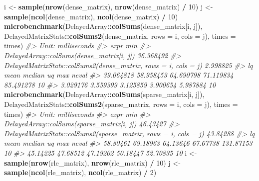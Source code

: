 \documentclass[]{book}
\newenvironment{Shaded}{\begin{snugshade}}{\end{snugshade}}
\newcommand{\KeywordTok}[1]{\textcolor[rgb]{0.13,0.29,0.53}{\textbf{#1}}}
\newcommand{\DataTypeTok}[1]{\textcolor[rgb]{0.13,0.29,0.53}{#1}}
\newcommand{\DecValTok}[1]{\textcolor[rgb]{0.00,0.00,0.81}{#1}}
\newcommand{\StringTok}[1]{\textcolor[rgb]{0.31,0.60,0.02}{#1}}
\newcommand{\CommentTok}[1]{\textcolor[rgb]{0.56,0.35,0.01}{\textit{#1}}}
\newcommand{\OperatorTok}[1]{\textcolor[rgb]{0.81,0.36,0.00}{\textbf{#1}}}
\newcommand{\NormalTok}[1]{#1}
\begin{document}
\begin{Shaded}
\begin{Highlighting}[]
\NormalTok{i <-}\StringTok{ }\KeywordTok{sample}\NormalTok{(}\KeywordTok{nrow}\NormalTok{(dense_matrix), }\KeywordTok{nrow}\NormalTok{(dense_matrix) }\OperatorTok{/}\StringTok{ }\DecValTok{10}\NormalTok{)}
\NormalTok{j <-}\StringTok{ }\KeywordTok{sample}\NormalTok{(}\KeywordTok{ncol}\NormalTok{(dense_matrix), }\KeywordTok{ncol}\NormalTok{(dense_matrix) }\OperatorTok{/}\StringTok{ }\DecValTok{10}\NormalTok{)}
\KeywordTok{microbenchmark}\NormalTok{(DelayedArray}\OperatorTok{::}\KeywordTok{colSums}\NormalTok{(dense_matrix[i, j]),}
\NormalTok{               DelayedMatrixStats}\OperatorTok{::}\KeywordTok{colSums2}\NormalTok{(dense_matrix, }\DataTypeTok{rows =}\NormalTok{ i, }\DataTypeTok{cols =}\NormalTok{ j),}
               \DataTypeTok{times =}\NormalTok{ times)}
\CommentTok{#> Unit: milliseconds}
\CommentTok{#>                                                            expr       min}
\CommentTok{#>                       DelayedArray::colSums(dense_matrix[i, j]) 36.368492}
\CommentTok{#>  DelayedMatrixStats::colSums2(dense_matrix, rows = i, cols = j)  2.998825}
\CommentTok{#>         lq      mean    median        uq       max neval}
\CommentTok{#>  39.064818 58.958453 64.690798 71.119834 85.491278    10}
\CommentTok{#>   3.029176  3.559399  3.125859  3.900654  5.987884    10}
\KeywordTok{microbenchmark}\NormalTok{(DelayedArray}\OperatorTok{::}\KeywordTok{colSums}\NormalTok{(sparse_matrix[i, j]),}
\NormalTok{               DelayedMatrixStats}\OperatorTok{::}\KeywordTok{colSums2}\NormalTok{(sparse_matrix, }\DataTypeTok{rows =}\NormalTok{ i, }\DataTypeTok{cols =}\NormalTok{ j),}
               \DataTypeTok{times =}\NormalTok{ times)}
\CommentTok{#> Unit: milliseconds}
\CommentTok{#>                                                             expr      min}
\CommentTok{#>                       DelayedArray::colSums(sparse_matrix[i, j]) 46.43427}
\CommentTok{#>  DelayedMatrixStats::colSums2(sparse_matrix, rows = i, cols = j) 43.84288}
\CommentTok{#>        lq     mean   median       uq       max neval}
\CommentTok{#>  58.80461 69.18963 64.13646 67.67738 131.87153    10}
\CommentTok{#>  45.14225 47.68512 47.19202 50.18447  52.70835    10}
\NormalTok{i <-}\StringTok{ }\KeywordTok{sample}\NormalTok{(}\KeywordTok{nrow}\NormalTok{(rle_matrix), }\KeywordTok{nrow}\NormalTok{(rle_matrix) }\OperatorTok{/}\StringTok{ }\DecValTok{10}\NormalTok{)}
\NormalTok{j <-}\StringTok{ }\KeywordTok{sample}\NormalTok{(}\KeywordTok{ncol}\NormalTok{(rle_matrix), }\KeywordTok{ncol}\NormalTok{(rle_matrix) }\OperatorTok{/}\StringTok{ }\DecValTok{2}\NormalTok{)}

\end{Highlighting}
\end{Shaded}
\end{document}
